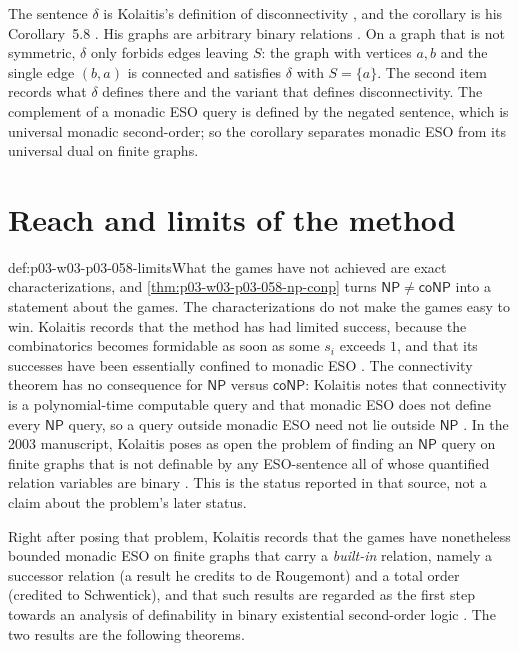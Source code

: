 The sentence \(\delta\) is Kolaitis's definition of disconnectivity
\cite[Example~2.5, p.~7]{Kolaitis2003ExpressivePowerNotes}, and the
corollary is his Corollary~5.8 \cite[p.~29]{Kolaitis2003ExpressivePowerNotes}.
His graphs are arbitrary binary relations \cite[p.~4]{Kolaitis2003ExpressivePowerNotes}.
On a graph that is not symmetric, \(\delta\) only forbids edges leaving
\(S\): the graph with vertices \(a,b\) and the single edge \((b,a)\) is
connected and satisfies \(\delta\) with \(S=\{a\}\). The second item
records what \(\delta\) defines there and the variant that defines
disconnectivity.
The complement of a monadic ESO query is defined by the negated sentence,
which is universal monadic second-order; so the corollary separates monadic
ESO from its universal dual on finite graphs.

\section{Reach and limits of the method}
\label{sec:p03-w03-p03-058-limits}

\begin{hbwarning}{def:p03-w03-p03-058-limits}{What the games have not achieved}
 are
exact characterizations, and \cref{thm:p03-w03-p03-058-np-conp} turns
\(\mathsf{NP}\ne\mathsf{coNP}\) into a statement about the games. The
characterizations do not make the games easy to win. Kolaitis records that
the method has had limited success, because the combinatorics becomes
formidable as soon as some \(s_i\) exceeds \(1\), and that its successes
have been essentially confined to monadic ESO
\cite[pp.~27 and~29]{Kolaitis2003ExpressivePowerNotes}. The connectivity
theorem has no consequence for \(\mathsf{NP}\) versus \(\mathsf{coNP}\):
Kolaitis notes that connectivity is a polynomial-time computable query and
that monadic ESO does not define every \(\mathsf{NP}\) query, so a query
outside monadic ESO need not lie outside \(\mathsf{NP}\)
\cite[p.~29]{Kolaitis2003ExpressivePowerNotes}. In the 2003 manuscript,
Kolaitis poses as open the problem of finding an \(\mathsf{NP}\) query on
finite graphs that is not definable by any ESO-sentence all of whose
quantified relation variables are binary
\cite[Problem~5.9, p.~29]{Kolaitis2003ExpressivePowerNotes}. This is the
status reported in that source, not a claim about the problem's later status.
\end{hbwarning}

Right after posing that problem, Kolaitis records that the games have
nonetheless bounded monadic ESO on finite graphs that carry a
\emph{built-in} relation, namely a successor relation (a result he credits
to de Rougemont) and a total order (credited to Schwentick), and that such
results are regarded as the first step towards an analysis of definability
in binary existential second-order logic
\cite[p.~29]{Kolaitis2003ExpressivePowerNotes}. The two results are the
following theorems.


